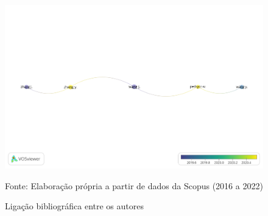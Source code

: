 \begin{figure}[H]
	\centering
	\caption{Ligação bibliográfica entre os autores}
	\label{fig:autores}
	\includegraphics[width=1\linewidth]{Revisao/Figuras/Autores}
	
	\vspace{0.2cm}
	Fonte: Elaboração própria a partir de dados da Scopus (2016 a 2022)
\end{figure}
